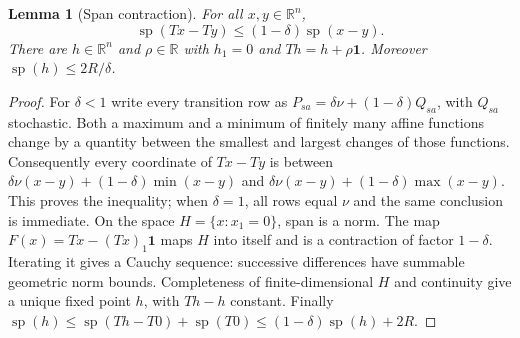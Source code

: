 \documentclass[11pt]{article}
\newtheorem{lemma}[theorem]{Lemma}
\theoremstyle{definition}
\newcommand{\R}{\mathbb R}
\begin{document}
\begin{lemma}[Span contraction]
For all $x,y\in\R^n$,
\[
 \operatorname{sp}(Tx-Ty)\leq(1-\delta)\operatorname{sp}(x-y).
\]
There are $h\in\R^n$ and $\rho\in\R$ with $h_1=0$ and
$Th=h+\rho\mathbf1$. Moreover $\operatorname{sp}(h)\leq2R/\delta$.
\end{lemma}
\begin{proof}
For $\delta<1$ write every transition row as
$P_{sa}=\delta\nu+(1-\delta)Q_{sa}$, with $Q_{sa}$ stochastic.
Both a maximum and a minimum of finitely many affine functions change by a
quantity between the smallest and largest changes of those functions.
Consequently every coordinate of $Tx-Ty$ is between
$\delta\nu(x-y)+(1-\delta)\min(x-y)$ and
$\delta\nu(x-y)+(1-\delta)\max(x-y)$. This proves the inequality;
when $\delta=1$, all rows equal $\nu$ and the same conclusion is immediate.
On the space $H=\{x:x_1=0\}$, span is a norm. The map
$F(x)=Tx-(Tx)_1\mathbf1$ maps $H$ into itself and is a contraction of factor
$1-\delta$. Iterating it gives a Cauchy sequence: successive differences have
summable geometric norm bounds. Completeness of finite-dimensional $H$ and
continuity give a unique fixed point $h$, with $Th-h$ constant.
Finally
$\operatorname{sp}(h)\leq\operatorname{sp}(Th-T0)+\operatorname{sp}(T0)
\leq(1-\delta)\operatorname{sp}(h)+2R$.
\end{proof}
\end{document}
